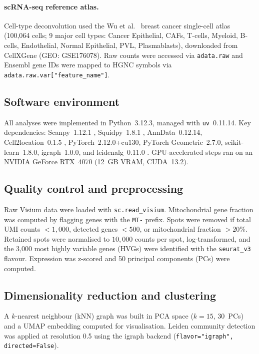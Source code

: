 \documentclass[12pt, a4paper]{article}
\begin{document}
\paragraph{scRNA-seq reference atlas.}
Cell-type deconvolution used the Wu et al.\ \citeyearpar{wu2021} breast cancer
single-cell atlas (100,064 cells; 9 major cell types: Cancer Epithelial, CAFs,
T-cells, Myeloid, B-cells, Endothelial, Normal Epithelial, PVL, Plasmablasts),
downloaded from CellXGene (GEO: GSE176078). Raw counts were accessed via
\texttt{adata.raw} and Ensembl gene IDs were mapped to HGNC symbols via
\texttt{adata.raw.var["feature\_name"]}.

\subsection{Software environment}

All analyses were implemented in Python~3.12.3, managed with
\texttt{uv}~0.11.14. Key dependencies: Scanpy~1.12.1 \citep{wolf2018},
Squidpy~1.8.1 \citep{palla2022}, AnnData~0.12.14, Cell2location~0.1.5
\citep{kleshchevnikov2022}, PyTorch~2.12.0+cu130, PyTorch
Geometric~2.7.0, scikit-learn~1.8.0, igraph~1.0.0, and
leidenalg~0.11.0 \citep{traag2019}. GPU-accelerated steps ran on an
NVIDIA GeForce RTX~4070 (12~GB VRAM, CUDA~13.2).

\subsection{Quality control and preprocessing}

Raw Visium data were loaded with \texttt{sc.read\_visium}. Mitochondrial gene
fraction was computed by flagging genes with the \texttt{MT-} prefix. Spots were
removed if total UMI counts $<1{,}000$, detected genes $<500$, or mitochondrial
fraction $>20\%$. Retained spots were normalised to $10{,}000$ counts per spot,
log-transformed, and the 3,000 most highly variable genes (HVGs) were identified
with the \texttt{seurat\_v3} flavour. Expression was z-scored and 50 principal
components (PCs) were computed.

\subsection{Dimensionality reduction and clustering}

A $k$-nearest neighbour (kNN) graph was built in PCA space ($k=15$, 30~PCs)
and a UMAP embedding computed for visualisation. Leiden community detection
\citep{traag2019} was applied at resolution 0.5 using the igraph backend
(\texttt{flavor="igraph", directed=False}).
\end{document}
